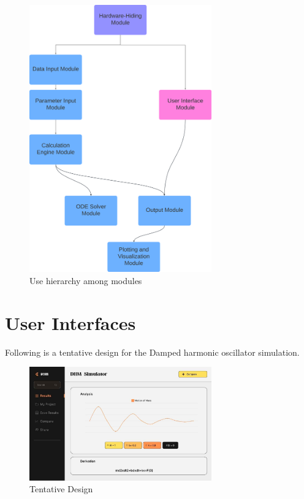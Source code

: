 \documentclass[12pt, titlepage]{article}
\begin{document}
\begin{figure}[H]
\centering
\includegraphics[width=0.7\textwidth]{hierarchy.png}
\caption{Use hierarchy among modules}
\label{FigUH}
\end{figure}


\section{User Interfaces}

Following is a tentative design for the Damped harmonic oscillator simulation.

\begin{figure}[H]
\centering
\includegraphics[width=0.7\textwidth]{UI.jpg}
\caption{Tentative Design}
\label{FigUI}
\end{figure}
\end{document}
